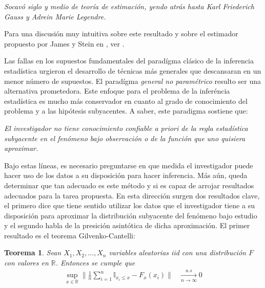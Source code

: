 \documentclass{book}
\theoremstyle{plain}
\newtheorem{thm}{Teorema}[section]
\theoremstyle{definition}
\theoremstyle{remark}
\begin{document}
\begin{changemargin}{1.5cm}{1.5cm}
\emph{Socavó siglo y medio de teoría de estimación, yendo atrás hasta Karl Friederich Gauss y Adrein Marie Legendre.}
\end{changemargin}

Para una discusión muy intuitiva sobre este resultado y sobre el estimador propuesto por James y Stein en \cite{STEIN2}, ver \cite{EFRON}.

Las fallas en los supuestos fundamentales del paradígma clásico de la inferencia estadística urgieron el desarrollo de técnicas más generales que descansaran en un menor número de supuestos. El paradígma \emph{general no paramétrico} resulto ser una alternativa prometedora. Este enfoque para el problema de la inferéncia estadística  es mucho más conservador en cuanto al grado de conocimiento del problema y a las hipótesis subyacentes. A saber, este paradigma sostiene que:

\begin{changemargin}{1.5cm}{1.5cm}
\emph{El investigador no tiene conocimiento confiable a priori de la regla estadística subyacente en el fenómeno bajo observación o de la función que uno quisiera aproximar.}
\end{changemargin}

Bajo estas líneas, es necesario preguntarse en que medida el investigador puede hacer uso de los datos a su disposición para hacer inferencia. Más aún, queda determinar que tan adecuado es este método y si es capaz de arrojar resultados adecuados para la tarea propuesta. En esta dirección surgen dos resultados clave, el primero dice que tiene sentido utilizar los datos que el investigador tiene a su disposición para aproximar la distribución subyacente del fenómeno bajo estudio y el segundo habla de la presición asintótica de dicha aproximación. El primer resultado es el teorema  Gilvenko-Cantelli:

\bigskip

\begin{thm}
Sean $X_1,X_2,\dots,X_n$ variables aleatorias iid con una distribución $F$ con valores en $\mathbb{R}$. Entonces se cumple que
\begin{equation*}
\begin{split}
\displaystyle\sup_{x\in\mathbb{R}}\bigg\|\frac{1}{n}\displaystyle\sum_{i=1}^n\mathbb{I}_{x_i\leq x}-F_{x}(x_i)\bigg\| &\xrightarrow[n\rightarrow\infty]{a.s} 0
\end{split}
\end{equation*}
\end{thm}
\end{document}
